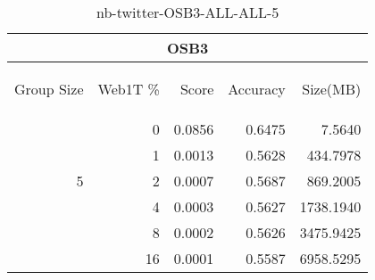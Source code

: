 \begin{center}
\begin{table}[htbp] 
 \begin{center}
\begin{tabular}{ | r | r | r | r | r |}
\hline
\multicolumn{5}{|c|}{OSB3}\\
\hline
\begin{sideways}Group Size\end{sideways} & \begin{sideways}Web1T \%\end{sideways} & \begin{sideways}Score\end{sideways} & \begin{sideways}Accuracy\end{sideways} & \begin{sideways}Size(MB)\end{sideways}\\
\hline
\multirow{5}{*}{5}
 & 0 & 0.0856 & 0.6475 & 7.5640\\ \cline{2-5}
 & 1 & 0.0013 & 0.5628 & 434.7978\\ \cline{2-5}
 & 2 & 0.0007 & 0.5687 & 869.2005\\ \cline{2-5}
 & 4 & 0.0003 & 0.5627 & 1738.1940\\ \cline{2-5}
 & 8 & 0.0002 & 0.5626 & 3475.9425\\ \cline{2-5}
 & 16 & 0.0001 & 0.5587 & 6958.5295\\ \cline{2-5}
\hline
\end{tabular}
\caption{nb-twitter-OSB3-ALL-ALL-5}
\label{table:nb-twitter-OSB3-ALL-ALL-5}
\end{center}
 \end{table}
\end{center}

